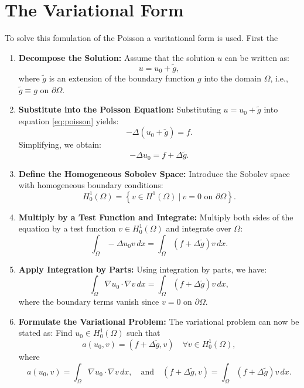 \documentclass{report}
\begin{document}
\section{The Variational Form}
To solve this fomulation of the Poisson a varitational form is used. First the 

\begin{enumerate}    
    \item \textbf{Decompose the Solution:}
    Assume that the solution $u$ can be written as:
    $$
    u = u_0 + \tilde{g},
    $$
    where $\tilde{g}$ is an extension of the boundary function $g$ into the domain $\Omega$, i.e., $\tilde{g} \equiv g$ on $\partial\Omega$.

    \item \textbf{Substitute into the Poisson Equation:}
    Substituting $u = u_0 + \tilde{g}$ into equation \eqref{eq:poisson} yields:
    $$
    -\Delta (u_0 + \tilde{g}) = f.
    $$
    Simplifying, we obtain:
    $$
    -\Delta u_0 = f + \Delta \tilde{g}.
    $$
    
    \item \textbf{Define the Homogeneous Sobolev Space:}
    Introduce the Sobolev space with homogeneous boundary conditions:
    $$
    H^1_0(\Omega) = \left\{ v \in H^1(\Omega) \ \bigg| \ v = 0 \text{ on } \partial\Omega \right\}.
    $$
    
    \item \textbf{Multiply by a Test Function and Integrate:}
    Multiply both sides of the equation by a test function $v \in H^1_0(\Omega)$ and integrate over $\Omega$:
    $$
    \int_{\Omega} -\Delta u_0 v \, dx = \int_{\Omega} \left( f + \Delta \tilde{g} \right) v \, dx.
    $$
    
    \item \textbf{Apply Integration by Parts:}
    Using integration by parts, we have:
    $$
    \int_{\Omega} \nabla u_0 \cdot \nabla v \, dx = \int_{\Omega} \left( f + \Delta \tilde{g} \right) v \, dx,
    $$
    where the boundary terms vanish since $v = 0$ on $\partial\Omega$.
    
    \item \textbf{Formulate the Variational Problem:}
    The variational problem can now be stated as: Find $u_0 \in H^1_0(\Omega)$ such that
    \begin{equation}
        a(u_0, v) = (f + \Delta \tilde{g}, v) \quad \forall v \in H^1_0(\Omega),
        \label{eq:variational}
    \end{equation}
    where
    $$
    a(u_0, v) = \int_{\Omega} \nabla u_0 \cdot \nabla v \, dx, \quad \text{and} \quad 
    (f + \Delta \tilde{g}, v) = \int_{\Omega} (f + \Delta \tilde{g}) v \, dx.
    $$
\end{enumerate}
\end{document}
